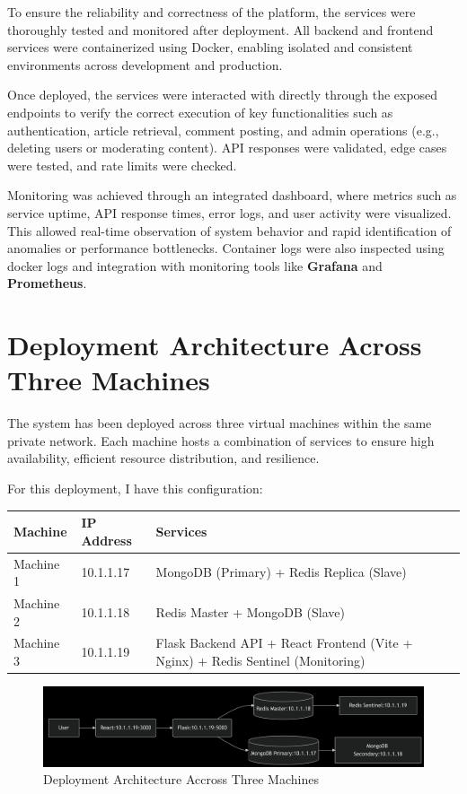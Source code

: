 To ensure the reliability and correctness of the platform, the services were thoroughly tested and monitored after deployment.
All backend and frontend services were containerized using Docker, enabling isolated and consistent environments across development and production.

Once deployed, the services were interacted with directly through the exposed endpoints to verify the correct execution of key functionalities such as authentication,
article retrieval, comment posting, and admin operations (e.g., deleting users\cite{randomuser} or moderating content).
API responses were validated, edge cases were tested, and rate limits were checked.

Monitoring was achieved through an integrated dashboard, where metrics such as service uptime, API response times, error logs, and user activity were visualized.
This allowed real-time observation of system behavior and rapid identification of anomalies or performance bottlenecks.
Container logs were also inspected using docker logs and integration with monitoring tools like \textbf{Grafana} and \textbf{Prometheus}.



\section{Deployment Architecture Across Three Machines}\label{sec:deployment-architecture-across-three-machines}


The system has been deployed across three virtual machines within the same private network.
Each machine hosts a combination of services to ensure high availability, efficient resource distribution, and resilience.

For this deployment, I have this configuration:

\begin{tabularx}{\textwidth}{llX}
  \toprule
  Machine & IP Address & Services \\
  \midrule
  Machine 1 & 10.1.1.17 & MongoDB (Primary) + Redis Replica (Slave) \\
  Machine 2 & 10.1.1.18 & Redis Master + MongoDB (Slave) \\
  Machine 3 & 10.1.1.19 & Flask Backend API + React Frontend (Vite + Nginx) + Redis Sentinel (Monitoring) \\
  \bottomrule
\end{tabularx}

\begin{figure}[!h]
    \centering
    \includegraphics[width=1\textwidth]{chapters/chapter_08/deployment-vm-3}
    \caption{Deployment Architecture Accross Three Machines}
    \label{fig:deployment-vm-3}
\end{figure}

